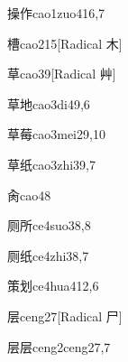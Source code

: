 \begin{verbete}{操作}{cao1zuo4}{16,7}
\end{verbete}

\begin{verbete}{槽}{cao2}{15}[Radical ⽊]
\end{verbete}

\begin{verbete}{草}{cao3}{9}[Radical 艸]
\end{verbete}

\begin{verbete}{草地}{cao3di4}{9,6}
\end{verbete}

\begin{verbete}{草莓}{cao3mei2}{9,10}
\end{verbete}

\begin{verbete}{草纸}{cao3zhi3}{9,7}
\end{verbete}

\begin{verbete}{肏}{cao4}{8}
\end{verbete}

\begin{verbete}{厕所}{ce4suo3}{8,8}
\end{verbete}

\begin{verbete}{厕纸}{ce4zhi3}{8,7}
\end{verbete}

\begin{verbete}{策划}{ce4hua4}{12,6}
\end{verbete}

\begin{verbete}{层}{ceng2}{7}[Radical ⼫]
\end{verbete}

\begin{verbete}{层层}{ceng2ceng2}{7,7}
\end{verbete}

